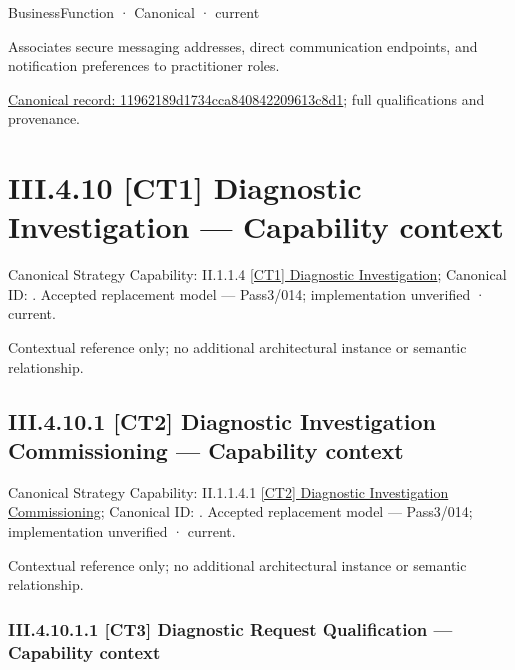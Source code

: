 \label{element:11962189d1734cca840842209613c8d1}
{\small BusinessFunction · Canonical · current}\par

Associates secure messaging addresses, direct communication endpoints, and notification preferences to practitioner roles.


{\footnotesize \href{../../../../../../../continuum/business/business-function/11962189d1734cca840842209613c8d1.md}{Canonical record: 11962189d1734cca840842209613c8d1}; full qualifications and provenance.}\par
\section*{III.4.10 [CT1] Diagnostic Investigation — Capability context}
\label{navigation:III.4.10}

{\small Canonical Strategy Capability: II.1.1.4 \hyperref[element:56d099bca3af4d87813fd0a7742987ee]{[CT1] Diagnostic Investigation}; Canonical ID: \texttt{}. Accepted replacement model — Pass3/014; implementation unverified · current.}\par
Contextual reference only; no additional architectural instance or semantic relationship.\par
\subsection*{III.4.10.1 [CT2] Diagnostic Investigation Commissioning — Capability context}
\label{navigation:III.4.10.1}

{\small Canonical Strategy Capability: II.1.1.4.1 \hyperref[element:5072e49fdf4f4e8da7e928b56b390137]{[CT2] Diagnostic Investigation Commissioning}; Canonical ID: \texttt{}. Accepted replacement model — Pass3/014; implementation unverified · current.}\par
Contextual reference only; no additional architectural instance or semantic relationship.\par
\subsubsection*{III.4.10.1.1 [CT3] Diagnostic Request Qualification — Capability context}
\label{navigation:III.4.10.1.1}

